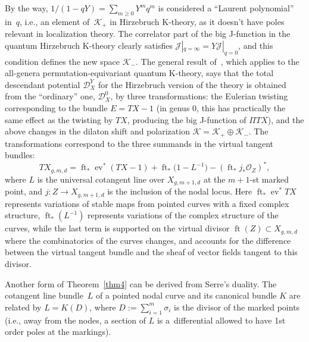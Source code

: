 \documentclass[pdftex]{sigma}
\numberwithin{equation}{section}
\def\D{\mathcal D}
\def\K{\mathcal K}
\def\J{\mathcal J}
\def\O{\mathcal O}
\def\ev{\operatorname{ev}}
\def\ft{\operatorname{ft}}
\begin{document}
\begin{Remark}\label{rmk5}
By the way, $1/(1-qY)=\sum_{m\geq 0} Y^mq^m$ is considered a ``Laurent polynomial'' in~$q$, i.e., an element of~$\K_{+}$ in Hirzebruch K-theory, as it doesn't have poles relevant in localization theory. The correlator part of the big J-function in the quantum Hirzebruch K-theory clearly satisfies $\J|_{q=\infty}=Y\J|_{q=0}$, and this condition defines the new space $\K_{-}$. The general result of~\cite{G-H}, which applies to the all-genera permutation-equivariant quantum K-theory, says that the total descendant potential $\D_X^Y$ for the Hirzebruch version of the theory is obtained from the ``ordinary'' one, $\D_X^0$, by three transformations: the Eulerian twisting corresponding to the bundle $E=TX-1$ (in genus $0$, this has practically the same effect as the twisting by $TX$, producing the big J-function of $\Pi T X$), and the above changes in the dilaton shift and polarization \mbox{$\K=\K_{+}\oplus \K_{-}$}. The transformations correspond to the three summands in the virtual tangent bundles:
\[
TX_{g,m,d}=\ft_*\ev^*(TX-1)+\ft_*\big(1-L^{-1}\big)-(\ft_*j_*\O_Z)^*,
\]
where $L$ is the universal cotangent line over $X_{g,m+1,d}$ at the $m+1$-st marked point, and $j\colon Z\to X_{g,m+1,d}$ is the inclusion of the nodal locus. Here $\ft_*\ev^*TX$ represents variations of stable maps from pointed curves with a fixed complex structure, $\ft_*(L^{-1})$ represents variations of the complex structure of the curves, while the last term is supported on the virtual divisor $\ft(Z)\subset X_{g,m,d}$ where the combinatorics of the curves changes, and accounts for the difference between the virtual tangent bundle and the sheaf of vector fields tangent to this divisor.
\end{Remark}

Another form of Theorem~\ref{thm4} can be derived from Serre's duality. The cotangent line bundle~$L$ of a pointed nodal curve and its canonical bundle $K$ are related by $L=K(D)$, where $D:=\sum_{i=1}^m\sigma_i$ is the divisor of the marked points (i.e., away from the nodes, a section of $L$ is a~differential allowed to have 1st order poles at the markings).
\end{document}
